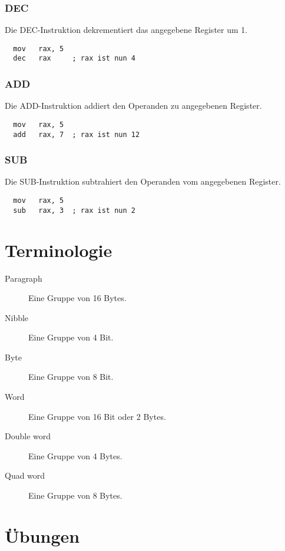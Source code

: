 \documentclass[12pt, a4paper, oneside]{article}
\begin{document}
\subsubsection{DEC}
Die DEC-Instruktion dekrementiert das angegebene Register um 1.
\begin{verbatim}
  mov   rax, 5
  dec   rax     ; rax ist nun 4
\end{verbatim} 

\subsubsection{ADD}
Die ADD-Instruktion addiert den Operanden zu angegebenen Register.
\begin{verbatim}
  mov   rax, 5
  add   rax, 7  ; rax ist nun 12
\end{verbatim} 

\subsubsection{SUB}
Die SUB-Instruktion subtrahiert den Operanden vom angegebenen Register.
\begin{verbatim}
  mov   rax, 5
  sub   rax, 3  ; rax ist nun 2
\end{verbatim} 


\newpage
\section{Terminologie}
\begin{description}
  \item[Paragraph] Eine Gruppe von 16 Bytes.
  \item[Nibble] Eine Gruppe von 4 Bit.
  \item[Byte] Eine Gruppe von 8 Bit.
  \item[Word] Eine Gruppe von 16 Bit oder 2 Bytes.
  \item[Double word] Eine Gruppe von 4 Bytes.
  \item[Quad word] Eine Gruppe von 8 Bytes.
\end{description}

\newpage
\section{Übungen}
\end{document}
